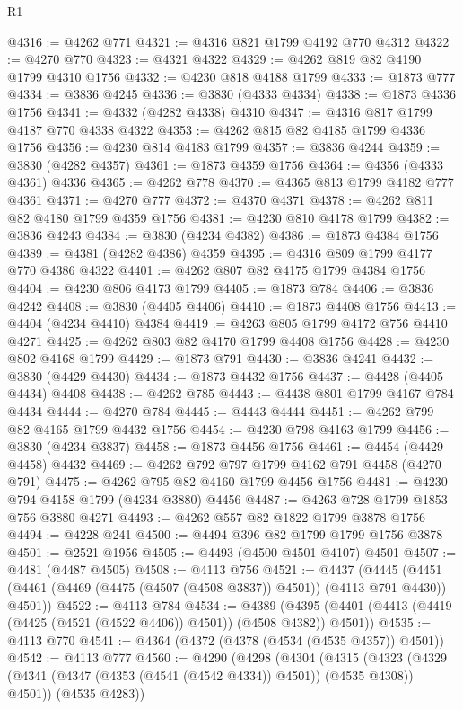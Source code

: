 \begin{lexlean}{R1}
\begin{coremodule}
@4316 := @4262 @771
@4321 := @4316 @821 @1799 @4192 @770 @4312
@4322 := @4270 @770
@4323 := @4321 @4322
@4329 := @4262 @819 @82 @4190 @1799 @4310 @1756
@4332 := @4230 @818 @4188 @1799
@4333 := @1873 @777
@4334 := @3836 @4245
@4336 := @3830 (@4333 @4334)
@4338 := @1873 @4336 @1756
@4341 := @4332 (@4282 @4338) @4310
@4347 := @4316 @817 @1799 @4187 @770 @4338 @4322
@4353 := @4262 @815 @82 @4185 @1799 @4336 @1756
@4356 := @4230 @814 @4183 @1799
@4357 := @3836 @4244
@4359 := @3830 (@4282 @4357)
@4361 := @1873 @4359 @1756
@4364 := @4356 (@4333 @4361) @4336
@4365 := @4262 @778
@4370 := @4365 @813 @1799 @4182 @777 @4361
@4371 := @4270 @777
@4372 := @4370 @4371
@4378 := @4262 @811 @82 @4180 @1799 @4359 @1756
@4381 := @4230 @810 @4178 @1799
@4382 := @3836 @4243
@4384 := @3830 (@4234 @4382)
@4386 := @1873 @4384 @1756
@4389 := @4381 (@4282 @4386) @4359
@4395 := @4316 @809 @1799 @4177 @770 @4386 @4322
@4401 := @4262 @807 @82 @4175 @1799 @4384 @1756
@4404 := @4230 @806 @4173 @1799
@4405 := @1873 @784
@4406 := @3836 @4242
@4408 := @3830 (@4405 @4406)
@4410 := @1873 @4408 @1756
@4413 := @4404 (@4234 @4410) @4384
@4419 := @4263 @805 @1799 @4172 @756 @4410 @4271
@4425 := @4262 @803 @82 @4170 @1799 @4408 @1756
@4428 := @4230 @802 @4168 @1799
@4429 := @1873 @791
@4430 := @3836 @4241
@4432 := @3830 (@4429 @4430)
@4434 := @1873 @4432 @1756
@4437 := @4428 (@4405 @4434) @4408
@4438 := @4262 @785
@4443 := @4438 @801 @1799 @4167 @784 @4434
@4444 := @4270 @784
@4445 := @4443 @4444
@4451 := @4262 @799 @82 @4165 @1799 @4432 @1756
@4454 := @4230 @798 @4163 @1799
@4456 := @3830 (@4234 @3837)
@4458 := @1873 @4456 @1756
@4461 := @4454 (@4429 @4458) @4432
@4469 := @4262 @792 @797 @1799 @4162 @791 @4458 (@4270 @791)
@4475 := @4262 @795 @82 @4160 @1799 @4456 @1756
@4481 := @4230 @794 @4158 @1799 (@4234 @3880) @4456
@4487 := @4263 @728 @1799 @1853 @756 @3880 @4271
@4493 := @4262 @557 @82 @1822 @1799 @3878 @1756
@4494 := @4228 @241
@4500 := @4494 @396 @82 @1799 @1799 @1756 @3878
@4501 := @2521 @1956
@4505 := @4493 (@4500 @4501 @4107) @4501
@4507 := @4481 (@4487 @4505)
@4508 := @4113 @756
@4521 := @4437
    (@4445 (@4451 (@4461 (@4469 (@4475 (@4507 (@4508 @3837)) @4501)) (@4113 @791 @4430)) @4501))
@4522 := @4113 @784
@4534 := @4389
    (@4395 (@4401 (@4413 (@4419 (@4425 (@4521 (@4522 @4406)) @4501)) (@4508 @4382)) @4501))
@4535 := @4113 @770
@4541 := @4364 (@4372 (@4378 (@4534 (@4535 @4357)) @4501))
@4542 := @4113 @777
@4560 := @4290
    (@4298
      (@4304
        (@4315
          (@4323 (@4329 (@4341 (@4347 (@4353 (@4541 (@4542 @4334)) @4501)) (@4535 @4308)) @4501))
          (@4535 @4283))

\end{coremodule}
\end{lexlean}
